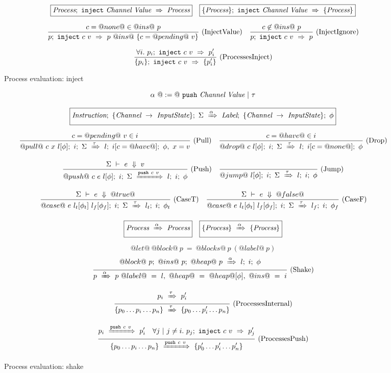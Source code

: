 
\begin{figure}

$$
\begin{array}{lr} 
  \boxed{\textit{Process};~\texttt{inject}~\textit{Channel}~\textit{Value}~\Rightarrow~\textit{Process}}
 & 
  \boxed{\{ \textit{Process} \};~\texttt{inject}~\textit{Channel}~\textit{Value}~\Rightarrow~\{ \textit{Process} \}}
 \end{array}
$$

$$
\enskip \frac {\displaystyle 
  c=@none@ \in @ins@~p
} {\displaystyle 
  p;~\texttt{inject}~c~v~\Rightarrow~p ~@ins@~ \{ c = @pending@~v\}
} \  \mbox{(InjectValue)} \enskip
\enskip \frac {\displaystyle 
  c \not\in @ins@~p
} {\displaystyle 
  p;~\texttt{inject}~c~v~\Rightarrow~p
} \  \mbox{(InjectIgnore)} \enskip
$$

$$
\enskip \frac {\displaystyle 
  \forall i.~ p_i;~\texttt{inject}~c~v~\Rightarrow~p'_i
} {\displaystyle 
  \{ p_i \};~\texttt{inject}~c~v~\Rightarrow~\{ p'_i \}
} \  \mbox{(ProcessesInject)} \enskip
$$

\caption{Process evaluation: inject}
\label{fig:Process:Eval:Inject}
\end{figure}


\begin{figure}

$$
\alpha~@:=@~ \texttt{push}~\textit{Channel}~\textit{Value} ~|~ \tau
$$

$$
  \boxed{
    \textit{Instruction};~\{\textit{Channel} ~\to~ \textit{InputState}\};~\Sigma~\xRightarrow{\alpha}~\textit{Label};~\{\textit{Channel} ~\to~ \textit{InputState}\};~\phi
  }
$$


$$
\enskip \frac {\displaystyle 
  c=@pending@~v \in i
} {\displaystyle 
  @pull@~c~x~l[\phi];~i;~\Sigma~\xRightarrow{\tau}~l;~i[c=@have@];~\phi,~x = v
} \  \mbox{(Pull)} \enskip
\enskip \frac {\displaystyle 
  c=@have@ \in i
} {\displaystyle 
  @drop@~c~l[\phi];~i;~\Sigma~\xRightarrow{\tau}~l;~i[c=@none@];~\phi
} \  \mbox{(Drop)} \enskip
$$

$$
\enskip \frac {\displaystyle 
  \Sigma~\vdash~e~\Downarrow~v
} {\displaystyle 
  @push@~c~e~l[\phi];~i;~\Sigma~\xRightarrow{\texttt{push}~c~v}~l;~i;~\phi
} \  \mbox{(Push)} \enskip
\enskip \frac {\displaystyle 
} {\displaystyle 
  @jump@~l[\phi];~i;~\Sigma~\xRightarrow{\tau}~l;~i;~\phi
} \  \mbox{(Jump)} \enskip
$$

$$
\enskip \frac {\displaystyle 
  \Sigma~\vdash~e~\Downarrow~@true@
} {\displaystyle 
  @case@~e~l_t[\phi_t]~l_f[\phi_f];~i;~\Sigma~\xRightarrow{\tau}~l_t;~i;~\phi_t
} \  \mbox{(CaseT)} \enskip
\enskip \frac {\displaystyle 
  \Sigma~\vdash~e~\Downarrow~@false@
} {\displaystyle 
  @case@~e~l_t[\phi_t]~l_f[\phi_f];~i;~\Sigma~\xRightarrow{\tau}~l_f;~i;~\phi_f
} \  \mbox{(CaseF)} \enskip
$$

$$
  \boxed{\textit{Process}~\xRightarrow{\alpha}~\textit{Process}}
  \quad
  \boxed{\{ \textit{Process} \}~\xRightarrow{\alpha}~\{ \textit{Process} \}}
$$

$$
@let@~@block@~p~=~@blocks@~p~(@label@~p)
$$
$$
\enskip \frac {\displaystyle 
  @block@~p;~@ins@~p;~@heap@~p~\xRightarrow{\alpha}~l;~i;~\phi
} {\displaystyle 
  p~\xRightarrow{\alpha}~p~@label@~=~l,~@heap@~=~@heap@[\phi],~@ins@~=~i
} \  \mbox{(Shake)} \enskip
$$




$$
\ruleIN{
  \ProcShake{p_i}{\tau}{p'_i}
}{
  \ProcsShake{
    \sgl{p_0 \ldots p_i \ldots p_n}
  }{\tau}{
    \sgl{p_0 \ldots p'_i \ldots p_n}
  }
}{ProcessesInternal}
$$

$$
\ruleIN{
  \ProcShake{p_i}{\Push~c~v}{p'_i}
  \quad
  \forall j~|~j \neq i.~
  \ProcInject{p_j}{c}{v}{p'_j}
}{
  \ProcsShake{
    \sgl{p_0 \ldots p_i \ldots p_n}
  }{\Push~c~v}{
    \sgl{p'_0 \ldots p'_i \ldots p'_n}
  }
}{ProcessesPush}
$$


\caption{Process evaluation: shake}
\label{fig:Process:Eval:Shake}
\end{figure}

